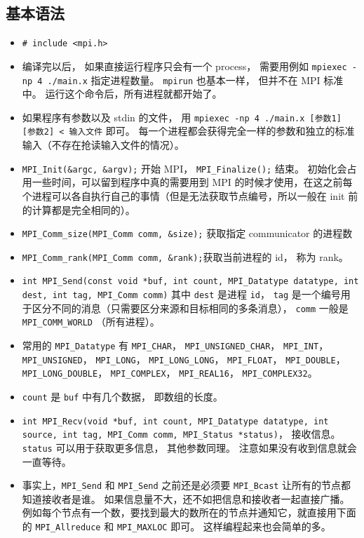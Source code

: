 \subsection{基本语法}
\begin{itemize}
\item \verb|# include <mpi.h>|
\item 编译完以后， 如果直接运行程序只会有一个 process， 需要用例如 \verb|mpiexec -np 4 ./main.x| 指定进程数量。 \verb|mpirun| 也基本一样， 但并不在 MPI 标准中。 运行这个命令后，所有进程就都开始了。
\item 如果程序有参数以及 stdin 的文件， 用 \verb`mpiexec -np 4 ./main.x [参数1] [参数2] < 输入文件` 即可。 每一个进程都会获得完全一样的参数和独立的标准输入（不存在抢读输入文件的情况）。
\item \verb|MPI_Init(&argc, &argv);| 开始 MPI， \verb|MPI_Finalize();| 结束。 初始化会占用一些时间，可以留到程序中真的需要用到 MPI 的时候才使用，在这之前每个进程可以各自执行自己的事情（但是无法获取节点编号，所以一般在 init 前的计算都是完全相同的）。
\item \verb|MPI_Comm_size(MPI_Comm comm, &size);| 获取指定 communicator 的进程数
\item \verb|MPI_Comm_rank(MPI_Comm comm, &rank);|获取当前进程的 id， 称为 rank。
\item \verb|int MPI_Send(const void *buf, int count, MPI_Datatype datatype, int dest, int tag, MPI_Comm comm)| 其中 \verb|dest| 是进程 \verb|id|， \verb|tag| 是一个编号用于区分不同的消息（只需要区分来源和目标相同的多条消息）， \verb|comm| 一般是 \verb|MPI_COMM_WORLD| （所有进程）。
\item 常用的 \verb|MPI_Datatype| 有 \verb|MPI_CHAR|， \verb|MPI_UNSIGNED_CHAR|， \verb|MPI_INT|， \verb|MPI_UNSIGNED|， \verb|MPI_LONG|， \verb|MPI_LONG_LONG|， \verb|MPI_FLOAT|， \verb|MPI_DOUBLE|， \verb|MPI_LONG_DOUBLE|， \verb|MPI_COMPLEX|， \verb|MPI_REAL16|， \verb|MPI_COMPLEX32|。
\item \verb|count| 是 \verb|buf| 中有几个数据， 即数组的长度。
\item \verb|int MPI_Recv(void *buf, int count, MPI_Datatype datatype, int source, int tag, MPI_Comm comm, MPI_Status *status)|， 接收信息。 \verb|status| 可以用于获取更多信息， 其他参数同理。 注意如果没有收到信息就会一直等待。
\item 事实上，\verb`MPI_Send` 和 \verb`MPI_Send` 之前还是必须要 \verb`MPI_Bcast` 让所有的节点都知道接收者是谁。 如果信息量不大，还不如把信息和接收者一起直接广播。例如每个节点有一个数，要找到最大的数所在的节点并通知它，就直接用下面的 \verb`MPI_Allreduce` 和 \verb`MPI_MAXLOC` 即可。 这样编程起来也会简单的多。

\end{itemize}
